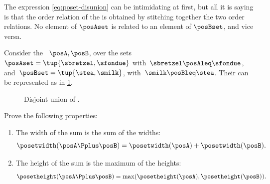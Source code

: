 The expression \cref{eq:poset-disunion} can be intimidating at first, but all it is saying is that the order relation of the  is obtained by stitching together the two order relations.
No element of $\posAset$ is related to an element of $\posBset$, and vice versa.

\begin{example}
    Consider the ~$\posA,\posB$, over the sets~$\posAset=\tup{\sbretzel, \sfondue}$ with~$\sbretzel \posAleq \sfondue$, and~$\posBset=\tup{\stea,\smilk}$, with~$\smilk \posBleq \stea$.
    Their  can be represented as in \cref{fig:poset-coproduct}.
    \begin{figure}[h!]
        \centering
        \caption{Disjoint union of .}
        \label{fig:poset-coproduct}
    \end{figure}
\end{example}
\vfill
\begin{gradedexercise}
    \label{ex:MeasurePosetSum}
    Prove the following properties:
    \begin{enumerate}
        \item The width of the sum is the sum of the widths:
              \begin{equation}\label{eq:MeasurePosetSum-1}
                  \posetwidth(\posA \Pplus \posB) = \posetwidth(\posA) + \posetwidth(\posB).
              \end{equation}
        \item The height of the sum is the maximum of the heights:
              \begin{equation}\label{eq:MeasurePosetSum-2}
                  \posetheight(\posA \Pplus \posB) = \max(\posetheight(\posA), \posetheight(\posB)).
              \end{equation}
    \end{enumerate}
\end{gradedexercise}
